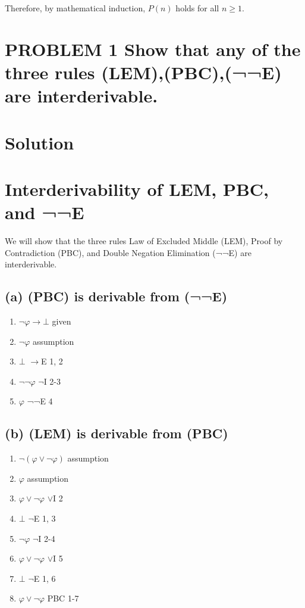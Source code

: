 \documentclass{article}
\newenvironment{proof}
{\begin{mdframed}[linewidth=0.5pt]\begin{enumerate}[label=\arabic*.,leftmargin=*]}
{\end{enumerate}\end{mdframed}}
\begin{document}
Therefore, by mathematical induction, $P(n)$ holds for all $n \geq 1$.


\newpage
\section*{PROBLEM 1 Show that any of the three rules 
{(LEM),(PBC),(¬¬E)} are interderivable.}
\section*{Solution}

\section*{Interderivability of LEM, PBC, and ¬¬E}

We will show that the three rules Law of Excluded Middle (LEM), Proof by Contradiction (PBC), and Double Negation Elimination (¬¬E) are interderivable.

\subsection*{(a) (PBC) is derivable from (¬¬E)}

\begin{proof}
\item $\neg\varphi \to \bot$ \hfill given
\item $\neg\varphi$ \hfill assumption
\item $\bot$ \hfill $\to$E 1, 2
\item $\neg\neg\varphi$ \hfill $\neg$I 2-3
\item $\varphi$ \hfill ¬¬E 4
\end{proof}

\subsection*{(b) (LEM) is derivable from (PBC)}

\begin{proof}
\item $\neg(\varphi \lor \neg\varphi)$ \hfill assumption
\item \quad $\varphi$ \hfill assumption
\item \quad $\varphi \lor \neg\varphi$ \hfill $\lor$I 2
\item \quad $\bot$ \hfill $\neg$E 1, 3
\item $\neg\varphi$ \hfill $\neg$I 2-4
\item $\varphi \lor \neg\varphi$ \hfill $\lor$I 5
\item $\bot$ \hfill $\neg$E 1, 6
\item $\varphi \lor \neg\varphi$ \hfill PBC 1-7
\end{proof}
\end{document}
